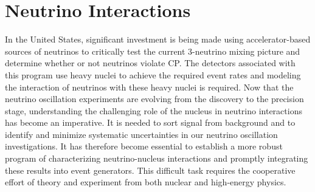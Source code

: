 \section{Neutrino Interactions}
\label{sec:Interactions}

In the United States, significant investment is being made using
accelerator-based sources of neutrinos to critically test the current
3-neutrino mixing picture and determine whether or not neutrinos
violate CP.
The detectors associated with this program use heavy nuclei to achieve
the required event rates and modeling the interaction of neutrinos
with these heavy nuclei is required.  Now that the neutrino
oscillation experiments are evolving from the discovery to the
precision stage, understanding the challenging role of the nucleus in
neutrino interactions has become an imperative. It is needed to sort
signal from background and to identify and minimize systematic
uncertainties in our neutrino oscillation investigations.
It has therefore become essential to establish a more robust program
of characterizing neutrino-nucleus interactions and promptly
integrating these results into event generators. This difficult task
requires the cooperative effort of theory and experiment from both
nuclear and high-energy physics.

